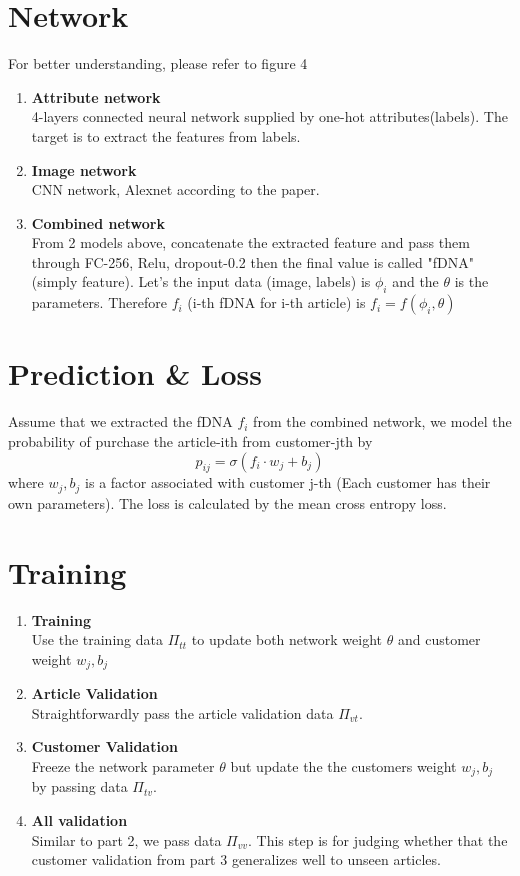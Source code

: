 \documentclass{article}
\begin{document}
\section*{Network}
For better understanding, please refer to figure 4\\
\begin{enumerate}
\item {\bf Attribute network}\\
4-layers connected neural network supplied by one-hot attributes(labels). The target is to extract the features from labels.
\item {\bf Image network}\\
CNN network, Alexnet according to the paper.
\item {\bf Combined network}\\
From 2 models above, concatenate the extracted feature and pass them through FC-256, Relu, dropout-0.2 then the final value is called "fDNA" (simply feature). Let's the input data (image, labels) is $\phi_i$ and the $\theta$ is the parameters. Therefore $f_i$ (i-th fDNA for i-th article) is $f_i=f(\phi_i, \theta)$
\end{enumerate}
\section*{Prediction \& Loss}
Assume that we extracted the fDNA $f_i$ from the combined network, we model the probability of purchase the article-ith from customer-jth by
\[p_{ij} = \sigma(f_i\cdot w_{j}+b_j)\]
where $w_j, b_j$ is a factor associated with customer j-th (Each customer has their own parameters).
The loss is calculated by the mean cross entropy loss.
\section*{Training}
\begin{enumerate}
\item {\bf Training}\\
Use the training data $\Pi_{tt}$ to update both network weight $\theta$ and customer weight $w_j, b_j$ 
\item {\bf Article Validation}\\
Straightforwardly pass the article validation data $\Pi_{vt}$.
\item {\bf Customer Validation}\\
Freeze the network parameter $\theta$ but update the the customers weight $w_j, b_j$ by passing data $\Pi_{tv}$.
\item {\bf All validation}\\
Similar to part 2, we pass data $\Pi_{vv}$. This step is for judging whether that the customer validation from part 3 generalizes well to unseen articles.
\end{enumerate}
\end{document}
